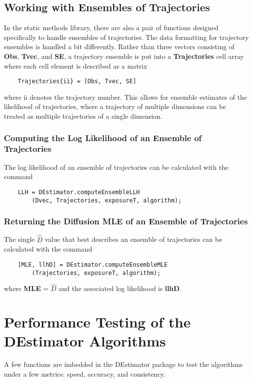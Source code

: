 \documentclass{article}
\begin{document}
\subsection{Working with Ensembles of Trajectories}
In the static methods library, there are also a pair of functions designed specifically to handle ensembles of trajectories.  The data formatting for trajectory ensembles is handled a bit differently.  Rather than three vectors consisting of \textbf{Obs}, \textbf{Tvec}, and \textbf{SE}, a trajectory ensemble is put into a \textbf{Trajectories} cell array where each cell element is described as a matrix
\begin{verbatim}
    Trajectories{ii} = [Obs, Tvec, SE]
\end{verbatim}
where ii denotes the trajectory number.  This allows for ensemble estimates of the likelihood of trajectories, where a trajectory of multiple dimensions can be treated as multiple trajectories of a single dimension.

\subsubsection{Computing the Log Likelihood of an Ensemble of Trajectories}
The log likelihood of an ensemble of trajectories can be calculated with the command
\begin{verbatim}
    LLH = DEstimator.computeEnsembleLLH
        (Dvec, Trajectories, exposureT, algorithm);
\end{verbatim}

\subsubsection{Returning the Diffusion MLE of an Ensemble of Trajectories}
The single $\hat{D}$ value that best describes an ensemble of trajectories can be calculated with the command
\begin{verbatim}
    [MLE, llhD] = DEstimator.computeEnsembleMLE
        (Trajectories, exposureT, algorithm);
\end{verbatim}
where \textbf{MLE} = $\hat{D}$ and the associated log likelihood is \textbf{llhD}.

\section{Performance Testing of the DEstimator Algorithms}
A few functions are imbedded in the DEstimator package to test the algorithms under a few metrics: speed, accuracy, and consistency.
\end{document}
